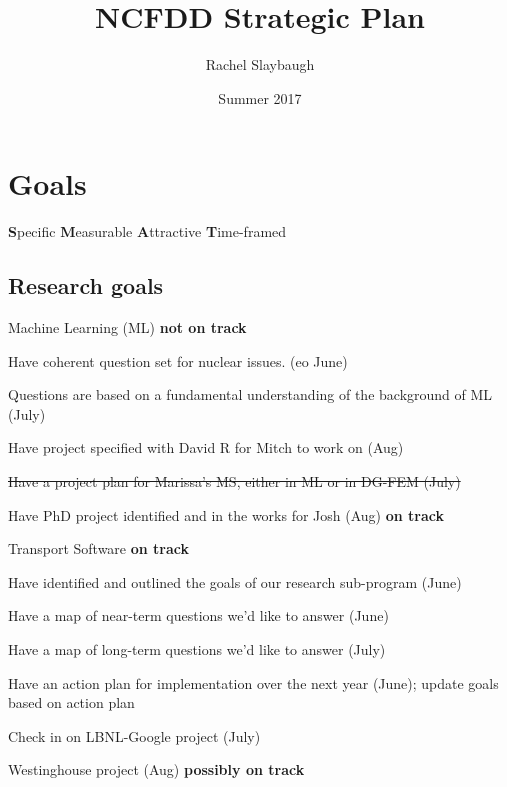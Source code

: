 \documentclass[12pt,twoside]{article}
\date{Summer 2017}
\title{NCFDD Strategic Plan}
\author{Rachel Slaybaugh}
\begin{document}
\maketitle

\section{Goals}
\textbf{S}pecific \textbf{M}easurable \textbf{A}ttractive \textbf{T}ime-framed

\subsection{Research goals}
\begin{compactitem}
\item Machine Learning (ML) \textbf{not on track}
  \begin{compactitem}
  \item Have coherent question set for nuclear issues. (eo June)
  \item Questions are based on a fundamental understanding of the background of ML (July)
  \item Have project specified with David R for Mitch to work on (Aug)
  \end{compactitem}
\item \st{Have a project plan for Marissa's MS, either in ML or in DG-FEM (July)}
\item Have PhD project identified and in the works for Josh (Aug) \textbf{on track}
\item Transport Software \textbf{on track}
  \begin{compactitem}
  \item Have identified and outlined the goals of our research sub-program (June)
  \item Have a map of near-term questions we'd like to answer (June) \
  \item Have a map of long-term questions we'd like to answer (July)
  \item Have an action plan for implementation over the next year (June); update goals based on action plan
  \end{compactitem}
\item Check in on LBNL-Google project (July)
\item Westinghouse project (Aug) \textbf{possibly on track}
\end{compactitem}
\end{document}
